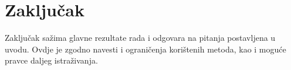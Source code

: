 \chapter{Zaključak}
\label{ch:zakljucak}

Zaključak sažima glavne rezultate rada i odgovara na pitanja postavljena u
uvodu.
Ovdje je zgodno navesti i ograničenja korištenih metoda, kao i moguće pravce
daljeg istraživanja.
